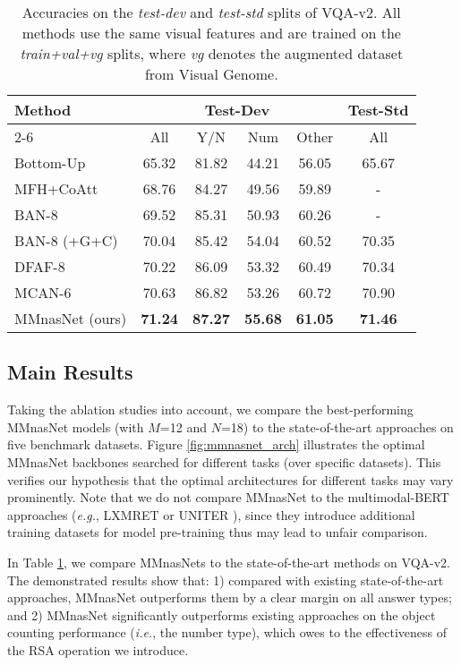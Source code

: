 \documentclass[sigconf]{acmart}
\begin{document}
\setcounter{table}{2}
\begin{table}
\centering
\small
\caption{Accuracies on the \emph{test-dev} and \emph{test-std} splits of VQA-v2. All methods use the same visual features \cite{anderson2017up-down} and are trained on the \emph{train+val+vg} splits, where \emph{vg} denotes the augmented dataset from Visual Genome.}
\label{table:vqav2}
\begin{tabular}{l|cccc|c}
\toprule
\multirow{3}{*}{Method} & \multicolumn{4}{c|}{Test-Dev} &Test-Std \\
\cmidrule{2-6}
 & All & Y/N & Num & Other & All \\
\midrule
Bottom-Up \cite{teney2018tips} &65.32& 81.82& 44.21& 56.05 &65.67\\
MFH+CoAtt \cite{yu2018beyond}& 68.76 &84.27 &49.56 &59.89& -\\
BAN-8 \cite{kim2018bilinear}& 69.52 &85.31& 50.93& 60.26&-\\
BAN-8 (+G+C) \cite{kim2018bilinear} & 70.04& 85.42& {54.04}&60.52&70.35 \\
DFAF-8 \cite{gao2019dynamic} & 70.22& 86.09& 53.32 &60.49 & 70.34 \\
MCAN-6 \cite{yu2019mcan} & 70.63 & {86.82} & 53.26 & 60.72 & 70.90 \\
\midrule
MMnasNet (ours) & \textbf{71.24} & \textbf{87.27} &\textbf{55.68} &\textbf{61.05} & \textbf{71.46}\\
\bottomrule
\end{tabular}
\end{table}

\subsection{Main Results}
Taking the ablation studies into account, we compare the best-performing MMnasNet models (with $M$=12 and $N$=18) to the state-of-the-art approaches on five benchmark datasets. Figure \ref{fig:mmnasnet_arch} illustrates the optimal MMnasNet backbones searched for different tasks (over specific datasets). This verifies our hypothesis that the optimal architectures for different tasks may vary prominently. Note that we do not compare MMnasNet to the multimodal-BERT approaches (\emph{e.g.}, LXMRET \cite{tan2019lxmert} or UNITER \cite{chen2019uniter}), since they introduce additional training datasets for model pre-training thus may lead to unfair comparison.

In Table \ref{table:vqav2}, we compare MMnasNets to the state-of-the-art methods on VQA-v2. The demonstrated results show that: 1) compared with existing state-of-the-art approaches, MMnasNet outperforms them by a clear margin on all answer types; and 2) MMnasNet significantly outperforms existing approaches on the object counting performance (\emph{i.e.}, the number type), which owes to the effectiveness of the RSA operation we introduce.
\end{document}
